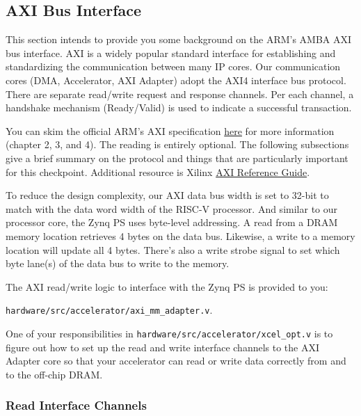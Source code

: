 \documentclass[11pt]{article}
\begin{document}
\subsection{AXI Bus Interface}

This section intends to provide you some background on the ARM's AMBA AXI bus interface.
AXI is a widely popular standard interface for establishing and standardizing the communication between many IP cores.
Our communication cores (DMA, Accelerator, AXI Adapter) adopt the AXI4 interface bus protocol.
There are separate read/write request and response channels.
Per each channel, a handshake mechanism (Ready/Valid) is used to indicate a successful transaction.

You can skim the official ARM's AXI specification \href{https://developer.arm.com/documentation/ihi0022/b}{here} for more information (chapter 2, 3, and 4).
The reading is entirely optional. The following subsections give a brief summary on the protocol and things that are particularly important for this checkpoint.
Additional resource is Xilinx \href{https://www.xilinx.com/support/documentation/ip\_documentation/ug761\_axi\_reference\_guide.pdf}{AXI Reference Guide}.

To reduce the design complexity, our AXI data bus width is set to 32-bit to match with the data word width of the RISC-V processor. And similar to our processor core, the Zynq PS uses byte-level addressing. A read from a DRAM memory location retrieves 4 bytes on the data bus. Likewise, a write to a memory location will update all 4 bytes. There's also a write strobe signal to set which byte lane(s) of the data bus to write to the memory.

The AXI read/write logic to interface with the Zynq PS is provided to you:

\verb|hardware/src/accelerator/axi_mm_adapter.v|.

One of your responsibilities in \verb|hardware/src/accelerator/xcel_opt.v| is to figure out how to set up the read and write interface channels to the AXI Adapter core so that your accelerator can read or write data correctly from and to the off-chip DRAM.

\subsubsection{Read Interface Channels}
\end{document}
